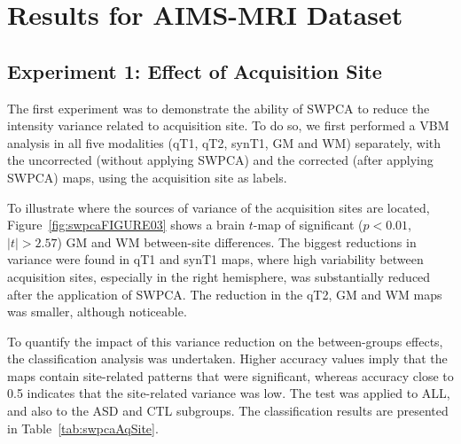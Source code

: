 \section{Results for AIMS-MRI Dataset}\label{sec:swpcaAIMSresults}
 
\subsection{Experiment 1: Effect of Acquisition Site}\label{sec:swpcaE1}
The first experiment was to demonstrate the ability of \ac{SWPCA} to reduce the intensity variance related to acquisition site. To do so, we first performed a \ac{VBM} analysis in all five modalities (\ac{qT1}, \ac{qT2}, \ac{synT1}, \ac{GM} and \ac{WM}) separately, with the uncorrected (without applying \ac{SWPCA}) and the corrected (after applying \ac{SWPCA}) maps, using the acquisition site as labels. 

To illustrate where the sources of variance of the acquisition sites are located, Figure~\ref{fig:swpcaFIGURE03} shows a brain $t$-map of significant ($p<0.01$, $|t|>2.57$) \ac{GM} and \ac{WM} between-site differences. The biggest reductions in variance were found in \ac{qT1} and \ac{synT1} maps, where high variability between acquisition sites, especially in the right hemisphere, was substantially reduced after the application of \ac{SWPCA}. The reduction in the \ac{qT2}, \ac{GM} and \ac{WM} maps was smaller, although noticeable. 

To quantify the impact of this variance reduction on the between-groups effects, the classification analysis was undertaken. Higher accuracy values imply that the maps contain site-related patterns that were significant, whereas accuracy close to 0.5 indicates that the site-related variance was low. The test was applied to ALL, and also to the \ac{ASD} and \ac{CTL} subgroups. The classification results are presented in Table~\ref{tab:swpcaAqSite}. 
	
